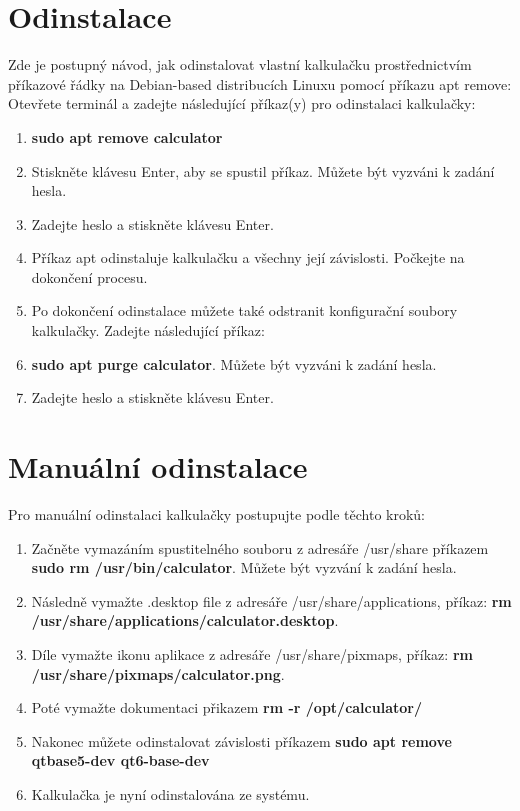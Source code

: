 \documentclass[a4paper, 11pt]{article}
\begin{document}
    \section{Odinstalace}
    Zde je postupný návod, jak odinstalovat vlastní kalkulačku prostřednictvím příkazové řádky na Debian-based distribucích Linuxu pomocí příkazu apt remove:
    Otevřete terminál a zadejte následující příkaz(y) pro odinstalaci kalkulačky:
    \begin{enumerate}
        \item \textbf{sudo apt remove calculator}
        \item Stiskněte klávesu Enter, aby se spustil příkaz. Můžete být vyzváni k zadání hesla.
        \item Zadejte heslo a stiskněte klávesu Enter.
        \item Příkaz apt odinstaluje kalkulačku a všechny její závislosti. Počkejte na dokončení procesu.
        \item Po dokončení odinstalace můžete také odstranit konfigurační soubory kalkulačky. Zadejte následující příkaz:
        \item \textbf{sudo apt purge calculator}. Můžete být vyzváni k zadání hesla.
        \item Zadejte heslo a stiskněte klávesu Enter.
    \end{enumerate}
    \section{Manuální odinstalace}
    Pro manuální odinstalaci kalkulačky postupujte podle těchto kroků:
        \begin{enumerate}
            \item Začněte vymazáním spustitelného souboru z adresáře /usr/share příkazem \textbf{sudo rm /usr/bin/calculator}. Můžete být vyzvání k zadání hesla.
            \item Následně vymažte .desktop file z adresáře /usr/share/applications, příkaz: \textbf{rm /usr/share/applications/calculator.desktop}.
            \item Díle vymažte ikonu aplikace z adresáře /usr/share/pixmaps, příkaz: \textbf{rm /usr/share/pixmaps/calculator.png}.
            \item Poté vymažte dokumentaci přikazem \textbf{rm -r /opt/calculator/}
            \item Nakonec můžete odinstalovat závislosti příkazem \textbf{sudo apt remove qtbase5-dev qt6-base-dev}
            \item Kalkulačka je nyní odinstalována ze systému.
        \end{enumerate}
\end{document}
